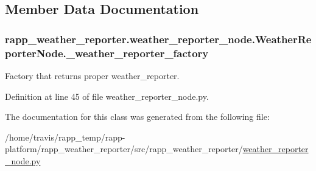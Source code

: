 \subsection{Member Data Documentation}
\hypertarget{classrapp__weather__reporter_1_1weather__reporter__node_1_1WeatherReporterNode_acb9502a76d0e8d44abc41ebe0c911cfa}{
\subsubsection[{\-\_\-weather\-\_\-reporter\-\_\-factory}]{\setlength{\rightskip}{0pt plus 5cm}rapp\-\_\-weather\-\_\-reporter.\-weather\-\_\-reporter\-\_\-node.\-Weather\-Reporter\-Node.\-\_\-weather\-\_\-reporter\-\_\-factory\hspace{0.3cm}{\ttfamily [private]}}}\label{classrapp__weather__reporter_1_1weather__reporter__node_1_1WeatherReporterNode_acb9502a76d0e8d44abc41ebe0c911cfa}


Factory that returns proper weather\-\_\-reporter. 



Definition at line 45 of file weather\-\_\-reporter\-\_\-node.\-py.



The documentation for this class was generated from the following file\-:\begin{DoxyCompactItemize}
\item 
/home/travis/rapp\-\_\-temp/rapp-\/platform/rapp\-\_\-weather\-\_\-reporter/src/rapp\-\_\-weather\-\_\-reporter/\hyperlink{weather__reporter__node_8py}{weather\-\_\-reporter\-\_\-node.\-py}\end{DoxyCompactItemize}
